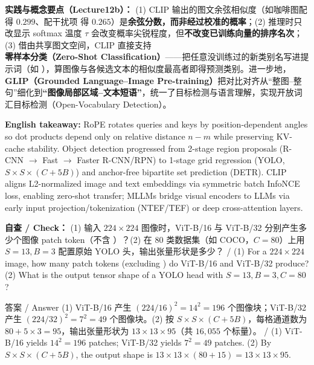 \textbf{实践与概念要点（Lecture12b）：} (1) CLIP 输出的图文余弦相似度（如咖啡图配  得 $0.299$、配干扰项  得 $0.265$）是\textbf{余弦分数，而非经过校准的概率}；(2) 推理时只改显示 softmax 温度 $\tau$ 会改变概率尖锐程度，但\textbf{不改变已训练向量的排序名次}；(3) 借由共享图文空间，CLIP 直接支持\textbf{零样本分类（Zero-Shot Classification）}——把任意没训练过的新类别名写进提示词（如 ），算图像与各候选文本的相似度最高者即得预测类别。进一步地，\textbf{GLIP（Grounded Language–Image Pre-training）}把对比对齐从“整图–整句”细化到\textbf{“图像局部区域–文本短语”}，统一了目标检测与语言理解，实现开放词汇目标检测（Open-Vocabulary Detection）。


\textbf{English takeaway:} RoPE rotates queries and keys by position-dependent angles so dot products depend only on relative distance $n-m$ while preserving KV-cache stability. Object detection progressed from 2-stage region proposals (R-CNN $\to$ Fast $\to$ Faster R-CNN/RPN) to 1-stage grid regression (YOLO, $S\times S\times(C+5B)$) and anchor-free bipartite set prediction (DETR). CLIP aligns L2-normalized image and text embeddings via symmetric batch InfoNCE loss, enabling zero-shot transfer; MLLMs bridge visual encoders to LLMs via early input projection/tokenization (NTEF/TEF) or deep cross-attention layers.

\textbf{自查 / Check：} (1) 输入 $224\times 224$ 图像时，ViT-B/16 与 ViT-B/32 分别产生多少个图像 patch token（不含 \StudyInline{[class]}）？(2) 在 $80$ 类数据集（如 COCO，$C=80$）上用 $S=13, B=3$ 配置原始 YOLO 头，输出张量形状是多少？ / (1) For a $224\times 224$ image, how many patch tokens (excluding \StudyInline{[class]}) do ViT-B/16 and ViT-B/32 produce? (2) What is the output tensor shape of a YOLO head with $S=13, B=3, C=80$?

\begin{StudySolution}{答案 / Answer}
(1) ViT-B/16 产生 $(224/16)^2 = 14^2 = 196$ 个图像块；ViT-B/32 产生 $(224/32)^2 = 7^2 = 49$ 个图像块。(2) 按 $S\times S\times(C+5B)$，每格通道数为 $80 + 5\times 3 = 95$，输出张量形状为 $13\times 13\times 95$（共 $16{,}055$ 个标量）。 / (1) ViT-B/16 yields $14^2=196$ patches; ViT-B/32 yields $7^2=49$ patches. (2) By $S\times S\times(C+5B)$, the output shape is $13\times 13\times(80+15) = 13\times 13\times 95$.
\end{StudySolution}

